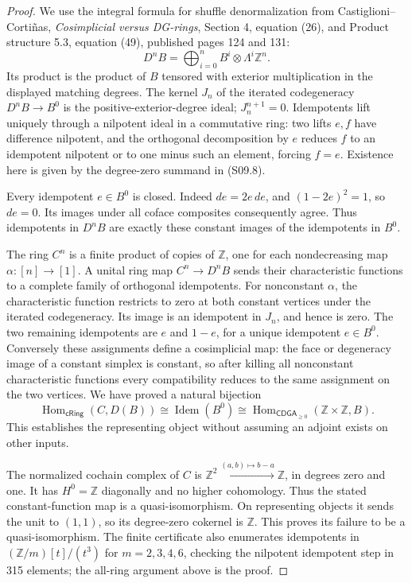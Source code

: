 \begin{proof}
We use the integral formula for shuffle denormalization from
Castiglioni--Corti\~nas, \emph{Cosimplicial versus DG-rings},
Section 4, equation (26), and Product structure 5.3,
equation (49), published pages 124 and 131:
\[
 D^nB=\bigoplus_{i=0}^{n}B^i\otimes\Lambda^i\mathbb Z^n.
 \tag{S09.8}
\]
Its product is the product of $B$ tensored with exterior multiplication
in the displayed matching degrees.  The kernel $J_n$ of the iterated
codegeneracy $D^nB\to B^0$ is the positive-exterior-degree ideal;
$J_n^{n+1}=0$.  Idempotents lift uniquely through a nilpotent ideal
in a commutative ring: two lifts $e,f$ have difference nilpotent,
and the orthogonal decomposition by $e$ reduces $f$ to an idempotent
nilpotent or to one minus such an element, forcing $f=e$.
Existence here is given by the degree-zero summand in (S09.8).

Every idempotent $e\in B^0$ is closed.  Indeed
$de=2e\,de$, and $(1-2e)^2=1$, so $de=0$.  Its images under all
coface composites consequently agree.  Thus idempotents in $D^nB$
are exactly these constant images of the idempotents in $B^0$.

The ring $C^n$ is a finite product of copies of $\mathbb Z$,
one for each nondecreasing map $\alpha:[n]\to[1]$.
A unital ring map $C^n\to D^nB$ sends their characteristic functions
to a complete family of orthogonal idempotents.  For nonconstant
$\alpha$, the characteristic function restricts to zero at both
constant vertices under the iterated codegeneracy.  Its image is
an idempotent in $J_n$, and hence is zero.  The two remaining
idempotents are $e$ and $1-e$, for a unique idempotent $e\in B^0$.
Conversely these assignments define a cosimplicial map: the face or
degeneracy image of a constant simplex is constant, so after killing
all nonconstant characteristic functions every compatibility reduces
to the same assignment on the two vertices.  We have proved a
natural bijection
\[
 \operatorname{Hom}_{\mathsf{cRing}}(C,D(B))
 \cong\operatorname{Idem}(B^0)
 \cong\operatorname{Hom}_{\mathsf{CDGA}_{\geq0}}
       (\mathbb Z\times\mathbb Z,B).
\]
This establishes the representing object without assuming an
adjoint exists on other inputs.

The normalized cochain complex of $C$ is
$\mathbb Z^2\xrightarrow{(a,b)\mapsto b-a}\mathbb Z$,
in degrees zero and one.  It has $H^0=\mathbb Z$ diagonally and
no higher cohomology.  Thus the stated constant-function map is
a quasi-isomorphism.  On representing objects it sends the unit
to $(1,1)$, so its degree-zero cokernel is $\mathbb Z$.
This proves its failure to be a quasi-isomorphism.  The finite
certificate also enumerates idempotents in
$(\mathbb Z/m)[t]/(t^3)$ for $m=2,3,4,6$, checking the nilpotent
idempotent step in 315 elements; the all-ring argument above is
the proof.
\end{proof}

